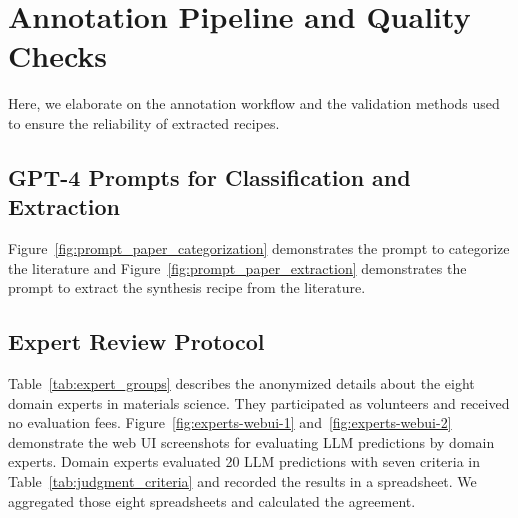 



\vspace{2em}
\section{Annotation Pipeline and Quality Checks}
\label{sec:appendix_annotation}

Here, we elaborate on the annotation workflow and the validation methods used to ensure the reliability of extracted recipes.

\subsection{GPT-4 Prompts for Classification and Extraction}
Figure~\ref{fig:prompt_paper_categorization} demonstrates the prompt to categorize the literature and Figure~\ref{fig:prompt_paper_extraction} demonstrates the prompt to extract the synthesis recipe from the literature.

\subsection{Expert Review Protocol}
\label{subsec:expert-protocol}

Table~\ref{tab:expert_groups} describes the anonymized details about the eight domain experts in materials science. They participated as volunteers and received no evaluation fees.
Figure~\ref{fig:experts-webui-1} and~\ref{fig:experts-webui-2} demonstrate the web UI screenshots for evaluating LLM predictions by domain experts. Domain experts evaluated 20 LLM predictions with seven criteria in Table~\ref{tab:judgment_criteria} and recorded the results in a spreadsheet. We aggregated those eight spreadsheets and calculated the agreement.

